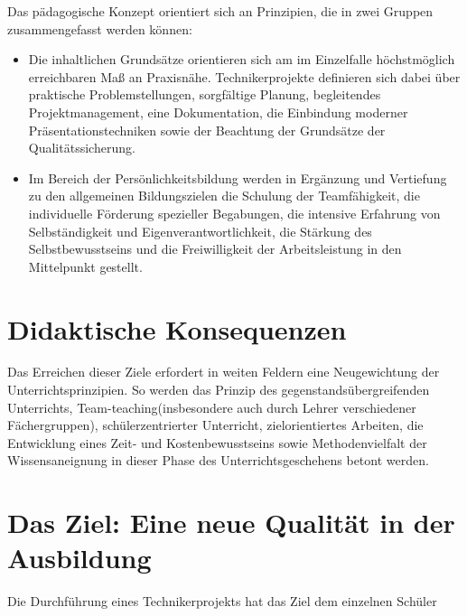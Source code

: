 Das pädagogische Konzept orientiert sich an Prinzipien, die in zwei Gruppen zusammengefasst werden können:

\begin{itemize}
	\item Die inhaltlichen Grundsätze orientieren sich am im Einzelfalle höchstmöglich erreichbaren Maß an Praxisnähe. Technikerprojekte definieren sich dabei über praktische Problemstellungen, sorgfältige Planung, begleitendes Projektmanagement, eine Dokumentation, die Einbindung moderner Präsentationstechniken sowie der Beachtung der Grundsätze der Qualitätssicherung.
	\item Im Bereich der Persönlichkeitsbildung werden in Ergänzung und Vertiefung zu den allgemeinen Bildungszielen die Schulung der Teamfähigkeit, die individuelle Förderung spezieller Begabungen, die intensive Erfahrung von Selbständigkeit und Eigenverantwortlichkeit, die Stärkung des Selbstbewusstseins und die Freiwilligkeit der Arbeitsleistung in den Mittelpunkt gestellt.
	
\end{itemize}


\section{Didaktische Konsequenzen}

Das Erreichen dieser Ziele erfordert in weiten Feldern eine Neugewichtung der Unterrichtsprinzipien. So werden das Prinzip des gegenstandsübergreifenden Unterrichts, \glqq Team-teaching\grqq (insbesondere auch durch Lehrer verschiedener Fächergruppen), schülerzentrierter Unterricht, zielorientiertes Arbeiten, die Entwicklung eines Zeit- und Kostenbewusstseins sowie Methodenvielfalt der Wissensaneignung in dieser Phase des Unterrichtsgeschehens betont werden.


\section{Das Ziel: Eine neue Qualität in der Ausbildung}

Die  Durchführung eines Technikerprojekts hat das Ziel dem einzelnen Schüler  

